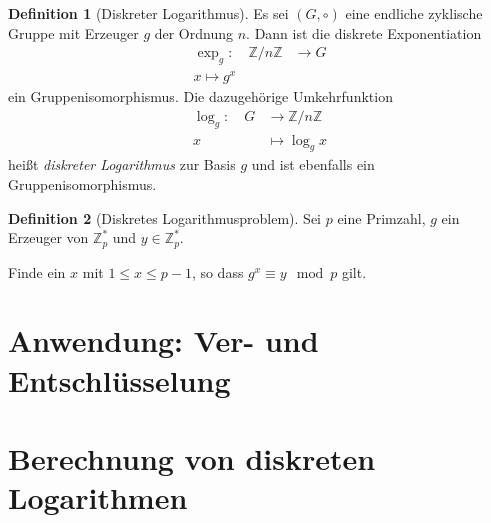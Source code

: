 \documentclass[
  a4paper,
  11pt,
]{scrartcl}
\theoremstyle{plain}
\theoremstyle{definition}
\newtheorem{definition}{Definition}
\theoremstyle{remark}
\newcommand{\Z}{\mathbb{Z}}
\begin{document}
\begin{definition}[Diskreter Logarithmus]
  Es sei $(G, \circ)$ eine endliche zyklische Gruppe mit Erzeuger $g$ der
  Ordnung $n$. Dann ist die diskrete Exponentiation
  \begin{align*}
    \exp_g: \quad \Z/n\Z & \to G\\
    x \mapsto g^x
  \end{align*}
  ein Gruppenisomorphismus. Die dazugehörige Umkehrfunktion
  \begin{align*}
    \log_g: \quad G & \to \Z/n\Z\\
    x & \mapsto \log_g x
  \end{align*}
  heißt \emph{diskreter Logarithmus} zur Basis $g$ und ist ebenfalls ein
  Gruppenisomorphismus.
\end{definition}

\begin{definition}[Diskretes Logarithmusproblem]
  Sei $p$ eine Primzahl, $g$ ein Erzeuger von $\Z_p^*$ und $y \in \Z_p^*$.

  Finde ein $x$ mit $1 \leq x \leq p-1$, so dass $g^x \equiv y \mod p$ gilt.
\end{definition}

\section{Anwendung: Ver- und Entschlüsselung}
\label{sec:anwendung_ver_und_entschlusselung}

\section{Berechnung von diskreten Logarithmen}
\label{sec:berechnung_von_diskreten_logarithmen}
\end{document}
